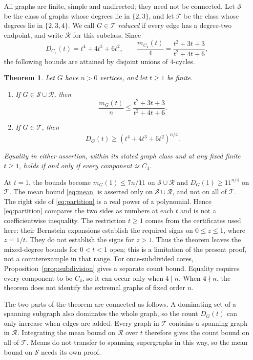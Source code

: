 \documentclass[11pt]{article}
\newtheorem{theorem}{Theorem}[section]
\begin{document}
All graphs are finite, simple and undirected; they need not be connected. Let $\mathcal S$ be the class of graphs whose degrees lie in $\{2,3\}$, and let $\mathcal T$ be the class whose degrees lie in $\{2,3,4\}$. We call $G\in\mathcal T$ \emph{reduced} if every edge has a degree-two endpoint, and write $\mathcal R$ for this subclass. Since
\[
 D_{C_4}(t)=t^4+4t^3+6t^2,\qquad
 \frac{m_{C_4}(t)}4=\frac{t^2+3t+3}{t^2+4t+6},
\]
the following bounds are attained by disjoint unions of $4$-cycles.

\begin{theorem}\label{thm:main}
Let $G$ have $n>0$ vertices, and let $t\ge1$ be finite.
\begin{enumerate}[label=(\roman*),itemsep=4pt]
\item If $G\in\mathcal S\cup\mathcal R$, then
\begin{equation}\label{eq:mean}
 \frac{m_G(t)}n\le\frac{t^2+3t+3}{t^2+4t+6}.
\end{equation}
\item If $G\in\mathcal T$, then
\begin{equation}\label{eq:partition}
 D_G(t)\ge(t^4+4t^3+6t^2)^{n/4}.
\end{equation}
\end{enumerate}
Equality in either assertion, within its stated graph class and at any fixed finite $t\ge1$, holds if and only if every component is $C_4$.
\end{theorem}
At $t=1$, the bounds become $m_G(1)\le7n/11$ on $\mathcal S\cup\mathcal R$ and $D_G(1)\ge11^{n/4}$ on $\mathcal T$. The mean bound \eqref{eq:mean} is asserted only on $\mathcal S\cup\mathcal R$, and not on all of $\mathcal T$. The right side of \eqref{eq:partition} is a real power of a polynomial. Hence \eqref{eq:partition} compares the two sides as numbers at each $t$ and is not a coefficientwise inequality. The restriction $t\ge1$ comes from the certificates used here: their Bernstein expansions establish the required signs on $0\le z\le1$, where $z=1/t$. They do not establish the signs for $z>1$. Thus the theorem leaves the mixed-degree bounds for $0<t<1$ open; this is a limitation of the present proof, not a counterexample in that range. For once-subdivided cores, Proposition~\ref{prop:subdivision} gives a separate count bound. Equality requires every component to be $C_4$, so it can occur only when $4\mid n$. When $4\nmid n$, the theorem does not identify the extremal graphs of fixed order $n$.

The two parts of the theorem are connected as follows. A dominating set of a spanning subgraph also dominates the whole graph, so the count $D_G(t)$ can only increase when edges are added. Every graph in $\mathcal T$ contains a spanning graph in $\mathcal R$. Integrating the mean bound on $\mathcal R$ over $t$ therefore gives the count bound on all of $\mathcal T$. Means do not transfer to spanning supergraphs in this way, so the mean bound on $\mathcal S$ needs its own proof.
\end{document}
